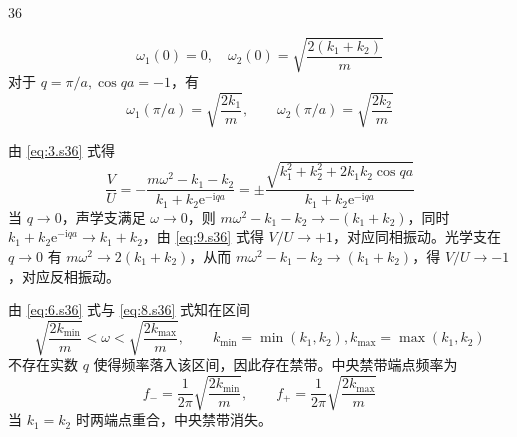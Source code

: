 \begin{solution}{36}
\begin{subsolution}
\begin{subsubsolution}
\begin{equation}
                \omega_ {1} (0) = 0, \quad \omega_ {2} (0) = \sqrt {\frac {2 \left(k _ {1} + k _ {2}\right)}{m}}
                \label{eq:7.s36}
            \end{equation}
            对于 $q = \pi / a, \cos qa = -1$，有
            \begin{equation}
                \omega_ {1} (\pi / a) = \sqrt {\frac {2 k _ {1}}{m}}, \qquad \omega_ {2} (\pi / a) = \sqrt {\frac {2 k _ {2}}{m}}
                \label{eq:8.s36}
            \end{equation}
        \end{subsubsolution}
        \begin{subsubsolution}
            由 \eqref{eq:3.s36} 式得
            \begin{equation}
                \frac {V}{U} = - \frac {m \omega^ {2} - k _ {1} - k _ {2}}{k _ {1} + k _ {2} \mathrm{e} ^ {- \mathrm{i} q a}} = \pm \frac {\sqrt {k _ {1} ^ {2} + k _ {2} ^ {2} + 2 k _ {1} k _ {2} \cos q a}}{k _ {1} + k _ {2} \mathrm{e} ^ {- \mathrm{i} q a}}
                \label{eq:9.s36}
            \end{equation}
            当 $q \rightarrow 0$，声学支满足 $\omega \rightarrow 0$，则 $m\omega^{2} - k_{1} - k_{2} \rightarrow -(k_{1} + k_{2})$，同时 $k_{1} + k_{2}\mathrm{e}^{-\mathrm{i}qa} \rightarrow k_{1} + k_{2}$，由 \eqref{eq:9.s36} 式得 $V/U \rightarrow +1$，对应同相振动。光学支在 $q \rightarrow 0$ 有 $m\omega^{2} \rightarrow 2(k_{1} + k_{2})$，从而 $m\omega^{2} - k_{1} - k_{2} \rightarrow (k_{1} + k_{2})$，得 $V/U \rightarrow -1$，对应反相振动。
        \end{subsubsolution}
        \begin{subsubsolution}
            由 \eqref{eq:6.s36} 式与 \eqref{eq:8.s36} 式知在区间
            \begin{equation}
                \sqrt {\frac {2 k _ {\mathrm{min}}}{m}} <   \omega <   \sqrt {\frac {2 k _ {\mathrm{max}}}{m}}, \qquad k _ {\mathrm{min}} = \min (k _ {1}, k _ {2}), k _ {\mathrm{max}} = \max (k _ {1}, k _ {2})
                \label{eq:10.s36}
            \end{equation}
            不存在实数 $q$ 使得频率落入该区间，因此存在禁带。中央禁带端点频率为
            \begin{equation}
                f _ {-} = \frac {1}{2 \pi} \sqrt {\frac {2 k _ {\mathrm{min}}}{m}}, \qquad f _ {+} = \frac {1}{2 \pi} \sqrt {\frac {2 k _ {\mathrm{max}}}{m}}
                \label{eq:11.s36}
            \end{equation}
            当 $k_{1} = k_{2}$ 时两端点重合，中央禁带消失。


\end{subsubsolution}
\end{subsolution}
\end{solution}
